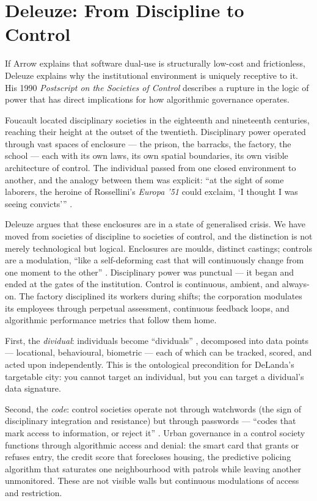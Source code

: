 \documentclass[12pt,a4paper,twoside]{report}
\begin{document}
\section{Deleuze: From Discipline to Control}
\label{sec:deleuze}

If Arrow explains that software dual-use is structurally low-cost and frictionless, Deleuze explains why the institutional environment is uniquely receptive to it. His 1990 \textit{Postscript on the Societies of Control} describes a rupture in the logic of power that has direct implications for how algorithmic governance operates.

Foucault \citeyearpar{foucault1975} located disciplinary societies in the eighteenth and nineteenth centuries, reaching their height at the outset of the twentieth. Disciplinary power operated through vast spaces of enclosure — the prison, the barracks, the factory, the school — each with its own laws, its own spatial boundaries, its own visible architecture of control. The individual passed from one closed environment to another, and the analogy between them was explicit: ``at the sight of some laborers, the heroine of Rossellini's \textit{Europa '51} could exclaim, `I thought I was seeing convicts''' \parencite[p.~3]{deleuze1990}.

Deleuze argues that these enclosures are in a state of generalised crisis. We have moved from societies of discipline to societies of control, and the distinction is not merely technological but logical. Enclosures are moulds, distinct castings; controls are a modulation, ``like a self-deforming cast that will continuously change from one moment to the other'' \parencite[p.~4]{deleuze1990}. Disciplinary power was punctual — it began and ended at the gates of the institution. Control is continuous, ambient, and always-on. The factory disciplined its workers during shifts; the corporation modulates its employees through perpetual assessment, continuous feedback loops, and algorithmic performance metrics that follow them home.

First, the \textit{dividual}: individuals become ``dividuals'' \parencite[p.~5]{deleuze1990}, decomposed into data points — locational, behavioural, biometric — each of which can be tracked, scored, and acted upon independently. This is the ontological precondition for DeLanda's targetable city: you cannot target an individual, but you can target a dividual's data signature.

Second, the \textit{code}: control societies operate not through watchwords (the sign of disciplinary integration and resistance) but through passwords — ``codes that mark access to information, or reject it'' \parencite[p.~5]{deleuze1990}. Urban governance in a control society functions through algorithmic access and denial: the smart card that grants or refuses entry, the credit score that forecloses housing, the predictive policing algorithm that saturates one neighbourhood with patrols while leaving another unmonitored. These are not visible walls but continuous modulations of access and restriction.
\end{document}
